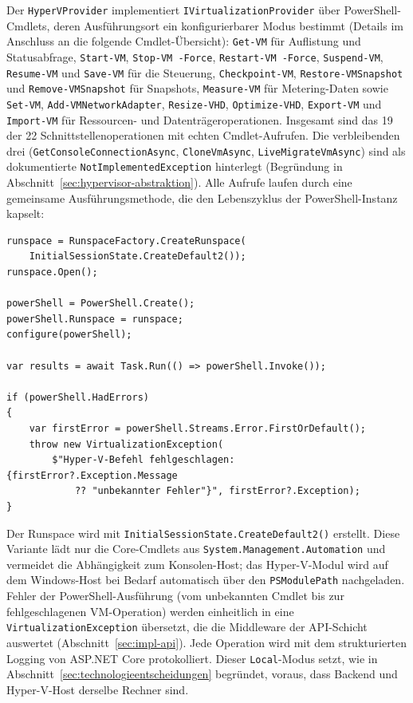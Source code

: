 \documentclass[12pt,a4paper]{article}
\begin{document}
Der \texttt{HyperVProvider} implementiert \texttt{IVirtualizationProvider} über PowerShell-Cmdlets, deren Ausführungsort ein konfigurierbarer Modus bestimmt (Details im Anschluss an die folgende Cmdlet-Übersicht): \texttt{Get-VM} für Auflistung und Statusabfrage, \texttt{Start-VM}, \texttt{Stop-VM -Force}, \texttt{Restart-VM -Force}, \texttt{Suspend-VM}, \texttt{Resume-VM} und \texttt{Save-VM} für die Steuerung, \texttt{Checkpoint-VM}, \texttt{Restore-VMSnapshot} und \texttt{Remove-VMSnapshot} für Snapshots, \texttt{Measure-VM} für Metering-Daten sowie \texttt{Set-VM}, \texttt{Add-VMNetworkAdapter}, \texttt{Resize-VHD}, \texttt{Optimize-VHD}, \texttt{Export-VM} und \texttt{Import-VM} für Ressourcen- und Datenträgeroperationen. Insgesamt sind das 19 der 22 Schnittstellenoperationen mit echten Cmdlet-Aufrufen. Die verbleibenden drei (\texttt{GetConsoleConnectionAsync}, \texttt{CloneVmAsync}, \texttt{LiveMigrateVmAsync}) sind als dokumentierte \texttt{NotImplementedException} hinterlegt (Begründung in Abschnitt~\ref{sec:hypervisor-abstraktion}). Alle Aufrufe laufen durch eine gemeinsame Ausführungsmethode, die den Lebenszyklus der PowerShell-Instanz kapselt:

\begin{lstlisting}[language={[Sharp]C}, caption={Kern der lokalen PowerShell-Ausführung im \texttt{HyperVProvider} im \texttt{Local}-Modus (gekürzt); der \texttt{Remote}-Modus im Anschluss ersetzt Runspace und Ausführung, die Cmdlet-Aufrufe selbst bleiben unverändert}, label={lst:invoke}]
runspace = RunspaceFactory.CreateRunspace(
    InitialSessionState.CreateDefault2());
runspace.Open();

powerShell = PowerShell.Create();
powerShell.Runspace = runspace;
configure(powerShell);

var results = await Task.Run(() => powerShell.Invoke());

if (powerShell.HadErrors)
{
    var firstError = powerShell.Streams.Error.FirstOrDefault();
    throw new VirtualizationException(
        $"Hyper-V-Befehl fehlgeschlagen: {firstError?.Exception.Message
            ?? "unbekannter Fehler"}", firstError?.Exception);
}
\end{lstlisting}

Der Runspace wird mit \texttt{InitialSessionState.CreateDefault2()} erstellt. Diese Variante lädt nur die Core-Cmdlets aus \texttt{System.Management.Automation} und vermeidet die Abhängigkeit zum Konsolen-Host; das Hyper-V-Modul wird auf dem Windows-Host bei Bedarf automatisch über den \texttt{PSModulePath} nachgeladen. Fehler der PowerShell-Ausführung (vom unbekannten Cmdlet bis zur fehlgeschlagenen VM-Operation) werden einheitlich in eine \texttt{VirtualizationException} übersetzt, die die Middleware der API-Schicht auswertet (Abschnitt~\ref{sec:impl-api}). Jede Operation wird mit dem strukturierten Logging von ASP.NET Core protokolliert. Dieser \texttt{Local}-Modus setzt, wie in Abschnitt~\ref{sec:technologieentscheidungen} begründet, voraus, dass Backend und Hyper-V-Host derselbe Rechner sind.
\end{document}
